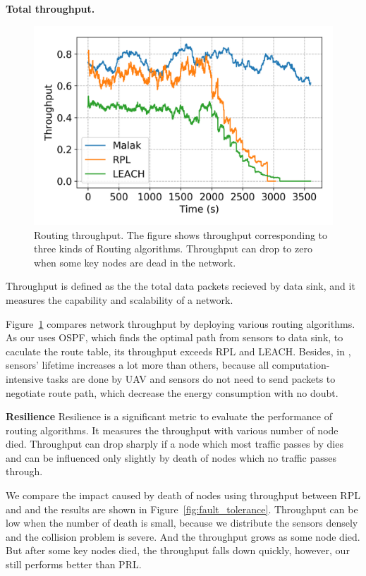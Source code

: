 \textbf{Total throughput.}
\begin{figure}[htbp]
	\centering
	\includegraphics[width=.85\columnwidth]{Figure/throughput}
	\vspace{-0.1in}
	\caption{Routing throughput.
		\textnormal{
			The figure shows throughput corresponding to three kinds of Routing
			algorithms. Throughput can drop to zero when some key nodes are dead
			in the network.
		}}
	\label{fig:throughput}
\end{figure}

Throughput is defined as the the total data packets recieved by data sink, and it
measures the capability and scalability of a network.

Figure~\ref{fig:throughput} compares network throughput by deploying various
routing algorithms. As our {\sdn} uses OSPF, which finds the optimal path from
sensors to data sink, to caculate the route table, its throughput exceeds RPL
and LEACH. Besides, in {\sdn}, sensors' lifetime increases a lot more than
others, because all computation-intensive tasks are done by UAV and sensors do
not need to send packets to negotiate route path, which decrease the energy
consumption with no doubt.

\textbf{Resilience}
Resilience  is a significant metric to evaluate the performance of routing
algorithms. It measures the throughput with various number of node died.
Throughput can drop sharply if a node which most traffic passes by dies and can
be influenced only slightly by death of nodes which no traffic passes through.

We compare the impact caused by death of nodes using throughput between RPL and
{\sdn} and the results are shown in Figure~\ref{fig:fault_tolerance}. Throughput
can be low when the number of death is small, because we distribute the sensors
densely and the collision problem is severe. And the throughput grows as some
node died. But after some key nodes died, the throughput falls down quickly,
however, our {\sdn} still performs better than PRL.

